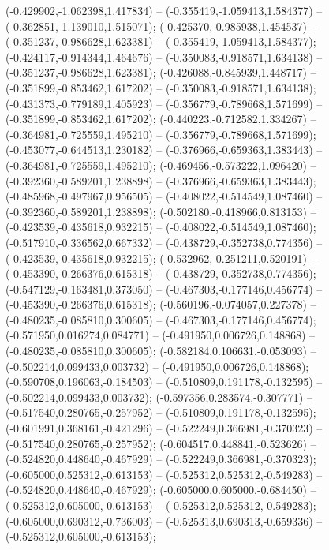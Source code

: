  (-0.429902,-1.062398,1.417834) -- (-0.355419,-1.059413,1.584377) -- (-0.362851,-1.139010,1.515071);
 (-0.425370,-0.985938,1.454537) -- (-0.351237,-0.986628,1.623381) -- (-0.355419,-1.059413,1.584377);
 (-0.424117,-0.914344,1.464676) -- (-0.350083,-0.918571,1.634138) -- (-0.351237,-0.986628,1.623381);
 (-0.426088,-0.845939,1.448717) -- (-0.351899,-0.853462,1.617202) -- (-0.350083,-0.918571,1.634138);
 (-0.431373,-0.779189,1.405923) -- (-0.356779,-0.789668,1.571699) -- (-0.351899,-0.853462,1.617202);
 (-0.440223,-0.712582,1.334267) -- (-0.364981,-0.725559,1.495210) -- (-0.356779,-0.789668,1.571699);
 (-0.453077,-0.644513,1.230182) -- (-0.376966,-0.659363,1.383443) -- (-0.364981,-0.725559,1.495210);
 (-0.469456,-0.573222,1.096420) -- (-0.392360,-0.589201,1.238898) -- (-0.376966,-0.659363,1.383443);
 (-0.485968,-0.497967,0.956505) -- (-0.408022,-0.514549,1.087460) -- (-0.392360,-0.589201,1.238898);
 (-0.502180,-0.418966,0.813153) -- (-0.423539,-0.435618,0.932215) -- (-0.408022,-0.514549,1.087460);
 (-0.517910,-0.336562,0.667332) -- (-0.438729,-0.352738,0.774356) -- (-0.423539,-0.435618,0.932215);
 (-0.532962,-0.251211,0.520191) -- (-0.453390,-0.266376,0.615318) -- (-0.438729,-0.352738,0.774356);
 (-0.547129,-0.163481,0.373050) -- (-0.467303,-0.177146,0.456774) -- (-0.453390,-0.266376,0.615318);
 (-0.560196,-0.074057,0.227378) -- (-0.480235,-0.085810,0.300605) -- (-0.467303,-0.177146,0.456774);
 (-0.571950,0.016274,0.084771) -- (-0.491950,0.006726,0.148868) -- (-0.480235,-0.085810,0.300605);
 (-0.582184,0.106631,-0.053093) -- (-0.502214,0.099433,0.003732) -- (-0.491950,0.006726,0.148868);
 (-0.590708,0.196063,-0.184503) -- (-0.510809,0.191178,-0.132595) -- (-0.502214,0.099433,0.003732);
 (-0.597356,0.283574,-0.307771) -- (-0.517540,0.280765,-0.257952) -- (-0.510809,0.191178,-0.132595);
 (-0.601991,0.368161,-0.421296) -- (-0.522249,0.366981,-0.370323) -- (-0.517540,0.280765,-0.257952);
 (-0.604517,0.448841,-0.523626) -- (-0.524820,0.448640,-0.467929) -- (-0.522249,0.366981,-0.370323);
 (-0.605000,0.525312,-0.613153) -- (-0.525312,0.525312,-0.549283) -- (-0.524820,0.448640,-0.467929);
 (-0.605000,0.605000,-0.684450) -- (-0.525312,0.605000,-0.613153) -- (-0.525312,0.525312,-0.549283);
 (-0.605000,0.690312,-0.736003) -- (-0.525313,0.690313,-0.659336) -- (-0.525312,0.605000,-0.613153);
